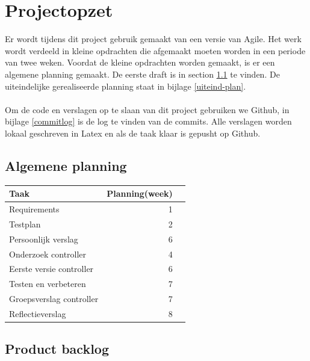 \documentclass{article}
\begin{document}
\section{Projectopzet}
Er wordt tijdens dit project gebruik gemaakt van een versie van Agile. Het werk wordt verdeeld in kleine opdrachten die afgemaakt moeten worden in een periode van twee weken. Voordat de kleine opdrachten worden gemaakt, is er een algemene planning gemaakt. De eerste draft is in section \ref{eerste-draft} te vinden. De uiteindelijke gerealiseerde planning staat in bijlage \ref{uiteind-plan}.\\\\
Om de code en verslagen op te slaan van dit project gebruiken we Github, in bijlage \ref{commitlog} is de log te vinden van de commits. Alle verslagen worden lokaal geschreven in Latex en als de taak klaar is gepusht op Github.

\subsection{Algemene planning}
\label{eerste-draft}
\begin{table}[h!]
\begin{tabularx}{\textwidth}{l r r}
 \textbf{Taak} & \textbf{Planning(week)}  \\ \hline
 Requirements & 1 \\
 Testplan & 2  \\
 Persoonlijk verslag & 6 \\
 Onderzoek controller & 4 \\
 Eerste versie controller & 6  \\
 Testen en verbeteren & 7  \\
 Groepsverslag controller & 7  \\
 Reflectieverslag & 8  \\
\end{tabularx}
\end{table}

\newpage

\subsection*{Product backlog}
\end{document}
